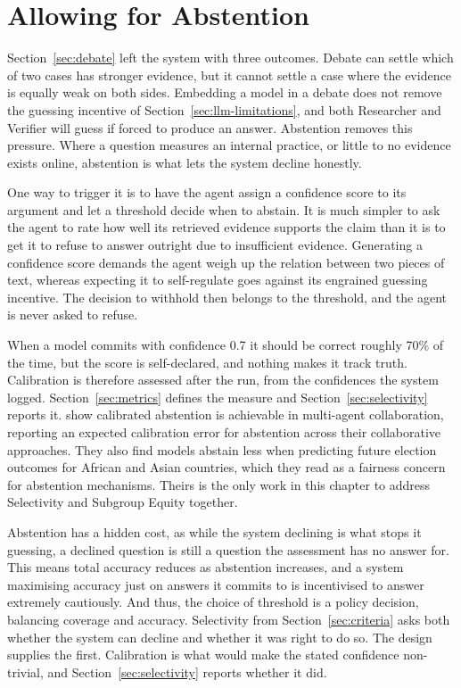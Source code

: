 \section{Allowing for Abstention}\label{sec:abstention}

Section~\ref{sec:debate} left the system with three outcomes. Debate can settle which of two cases has stronger evidence, but it cannot settle a case where the evidence is equally weak on both sides. Embedding a model in a debate does not remove the guessing incentive of Section~\ref{sec:llm-limitations}, and both Researcher and Verifier will guess if forced to produce an answer. Abstention removes this pressure. Where a question measures an internal practice, or little to no evidence exists online, abstention is what lets the system decline honestly.

One way to trigger it is to have the agent assign a confidence score to its argument and let a threshold decide when to abstain. It is much simpler to ask the agent to rate how well its retrieved evidence supports the claim than it is to get it to refuse to answer outright due to insufficient evidence. Generating a confidence score demands the agent weigh up the relation between two pieces of text, whereas expecting it to self-regulate goes against its engrained guessing incentive. The decision to withhold then belongs to the threshold, and the agent is never asked to refuse.

When a model commits with confidence 0.7 it should be correct roughly 70\% of the time, but the score is self-declared, and nothing makes it track truth. Calibration is therefore assessed after the run, from the confidences the system logged. Section~\ref{sec:metrics} defines the measure and Section~\ref{sec:selectivity} reports it. \citet{feng2024} show calibrated abstention is achievable in multi-agent collaboration, reporting an expected calibration error for abstention across their collaborative approaches. They also find models abstain less when predicting future election outcomes for African and Asian countries, which they read as a fairness concern for abstention mechanisms. Theirs is the only work in this chapter to address Selectivity and Subgroup Equity together.

Abstention has a hidden cost, as while the system declining is what stops it guessing, a declined question is still a question the assessment has no answer for. This means total accuracy reduces as abstention increases, and a system maximising accuracy just on answers it commits to is incentivised to answer extremely cautiously. And thus, the choice of threshold is a policy decision, balancing coverage and accuracy. Selectivity from Section~\ref{sec:criteria} asks both whether the system can decline and whether it was right to do so. The design supplies the first. Calibration is what would make the stated confidence non-trivial, and Section~\ref{sec:selectivity} reports whether it did.

